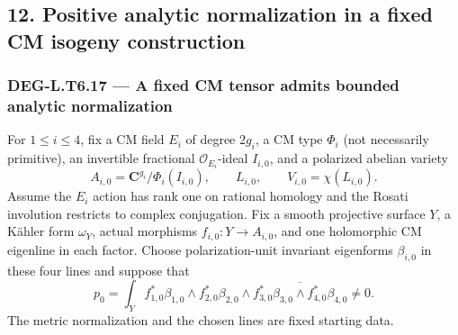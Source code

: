\documentclass[11pt,a4paper]{article}
\theoremstyle{definition}
\begin{document}
\subsection{12. Positive analytic normalization in a fixed CM isogeny construction}\label{positive-analytic-normalization-in-a-fixed-cm-isogeny-construction}

\subsubsection{DEG-L.T6.17 --- A fixed CM tensor admits bounded analytic normalization}\label{DEG-L.T6.17}

For \(1\le i\le4\), fix a CM field \(E_i\) of degree \(2g_i\), a CM type \(\Phi_i\) (not necessarily primitive), an invertible fractional \(\mathcal O_{E_i}\)-ideal \(I_{i,0}\), and a polarized abelian variety \[
A_{i,0}=\mathbf C^{g_i}/\Phi_i(I_{i,0}),\qquad L_{i,0},\qquad
V_{i,0}=\chi(L_{i,0}).
\tag{T17.1}
\] Assume the \(E_i\) action has rank one on rational homology and the Rosati involution restricts to complex conjugation. Fix a smooth projective surface \(Y\), a Kähler form \(\omega_Y\), actual morphisms \(f_{i,0}:Y\to A_{i,0}\), and one holomorphic CM eigenline in each factor. Choose polarization-unit invariant eigenforms \(\beta_{i,0}\) in these four lines and suppose that \[
p_0=\int_Y f_{1,0}^*\beta_{1,0}\wedge f_{2,0}^*\beta_{2,0}
            \wedge\overline{f_{3,0}^*\beta_{3,0}\wedge f_{4,0}^*\beta_{4,0}}
\ne0.
\tag{T17.2}
\] The metric normalization and the chosen lines are fixed starting data.
\end{document}
